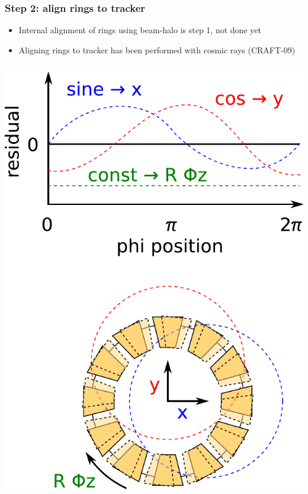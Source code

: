 \documentclass[compress]{beamer}
\begin{document}
\begin{frame}
\frametitle{Step 2: align rings to tracker}

\begin{itemize}
\item Internal alignment of rings using beam-halo is step 1, not done yet
\item Aligning rings to tracker has been performed with cosmic rays \mbox{\scriptsize (CRAFT-09)\hspace{-1 cm}}
\end{itemize}

\begin{columns}
\includegraphics[width=\linewidth]{tracker_disk_interpretation.pdf}


\end{columns}
\end{frame}
\end{document}
